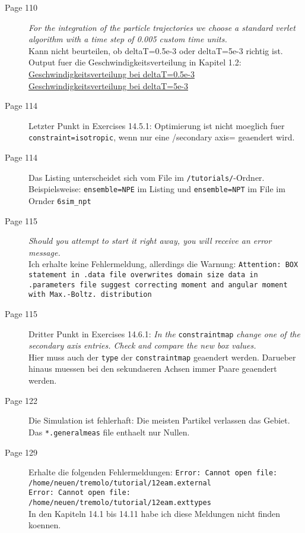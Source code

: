 \documentclass[11pt]{article}
\begin{document}
\begin{description}
\item [Page 110] \emph{For the integration of the particle trajectories we choose a standard verlet algorithm with a time step of 0.005 custom time units.} \\
                  
                  Kann nicht beurteilen, ob deltaT=0.5e-3 oder deltaT=5e-3 richtig ist. 
                  Output fuer die Geschwindigkeitsverteilung in Kapitel 1.2:\\
                  \href{file:///home/huber/Work/todos/pics/argon.histogram.png}{Geschwindigkeitsverteilung bei deltaT=0.5e-3}\\
                  \href{file:///home/huber/Work/todos/pics/argon.short.histogram.png}{Geschwindigkeitsverteilung bei deltaT=5e-3}
\item [Page 114] Letzter Punkt in Exercises 14.5.1: Optimierung ist nicht moeglich fuer \texttt{constraint=isotropic}, wenn nur eine /secondary axis= geaendert wird.
\item [Page 114] Das Listing unterscheidet sich vom File im \texttt{/tutorials/}-Ordner. Beispielsweise: \texttt{ensemble=NPE} im Listing und \texttt{ensemble=NPT} im File im Ornder \texttt{6sim\_npt}
\item [Page 115] \emph{Should you attempt to start it right away, you will receive an error message.} \\
                   Ich erhalte keine Fehlermeldung, allerdings die Warnung: \texttt{Attention: BOX statement in .data file overwrites domain size data in .parameters file suggest correcting moment and angular moment with Max.-Boltz. distribution}
\item [Page 115] Dritter Punkt in Exercises 14.6.1: \emph{In the} \texttt{constraintmap} \emph{change one of the secondary axis entries. Check and compare the new box values.} \\
                  Hier muss auch der \texttt{type} der \texttt{constraintmap} geaendert werden. Darueber hinaus muessen bei den sekundaeren Achsen immer Paare geaendert werden.
\item [Page 122] Die Simulation ist fehlerhaft: Die meisten Partikel verlassen das Gebiet. Das \texttt{*.generalmeas} file enthaelt nur Nullen.
\item [Page 129] Erhalte die folgenden Fehlermeldungen: 
                   \texttt{Error: Cannot open file: /home/neuen/tremolo/tutorial/12eam.external} \\
                   \texttt{Error: Cannot open file: /home/neuen/tremolo/tutorial/12eam.exttypes} \\
                   In den Kapiteln 14.1 bis 14.11 habe ich diese Meldungen nicht finden koennen.
\end{description}
\end{document}
